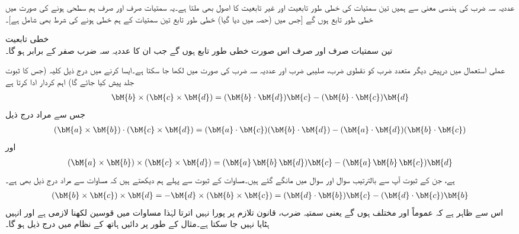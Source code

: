 عددیہ سہ ضرب کی ہندسی معنی سے ہمیں تین سمتیات کی خطی طور تابعیت اور غیر تابعیت کا اصول بھی ملتا ہے۔یہ سمتیات صرف اور صرف ہم سطحی ہونے کی صورت میں خطی طور تابع ہوں گے [جس میں (حصہ  میں دیا گیا) خطی طور تابع تین سمتیات کے ہم خطی ہونے کی شرط بھی شامل ہے]۔

\quad خطی تابعیت\\
تین سمتیات صرف اور صرف اس صورت خطی طور تابع ہوں گے جب ان کا عددیہ سہ ضرب صفر کے برابر ہو گا۔

عملی استعمال میں درپیش دیگر متعدد ضرب کو نقطوی ضرب، صلیبی ضرب اور عددیہ سہ ضرب کی صورت میں لکھا جا سکتا ہے۔ایسا کرنے میں درج ذیل کلیہ (جس کا ثبوت جلد پیش کیا جائے گا) اہم کردار ادا کرتا ہے
\begin{align}\label{مساوات_الجبرا_خطیت_اور_حجم_الف}
\bM{b}\times (\bM{c}\times \bM{d})=(\bM{b}\cdot \bM{d})\bM{c}-(\bM{b}\cdot\bM{c})\bM{d}
\end{align}
جس سے مراد درج ذیل  
\begin{align}\label{مساوات_الجبرا_خطیت_اور_حجم_ب}
(\bM{a}\times \bM{b})\cdot(\bM{c}\times\bM{d})=(\bM{a}\cdot\bM{c})(\bM{b}\cdot\bM{d})-(\bM{a}\cdot\bM{d})(\bM{b}\cdot\bM{c})
\end{align}
اور
\begin{align}\label{مساوات_الجبرا_خطیت_اور_حجم_پ}
(\bM{a}\times \bM{b})\times(\bM{c}\times\bM{d})=(\bM{a}\,\bM{b}\,\bM{d})\bM{c}-(\bM{a}\,\bM{b}\,\bM{c})\bM{d}
\end{align}
ہے، جن کے ثبوت آپ سے بالترتیب سوال  اور سوال  میں مانگے گئے ہیں۔مساوات   کے ثبوت سے پہلے ہم دیکھتے ہیں کہ مساوات  سے مراد درج ذیل بھی ہے۔
\begin{align*}
(\bM{b}\times \bM{c})\times \bM{d}=-\bM{d}\times (\bM{b}\times \bM{c})=(\bM{d}\cdot \bM{b})\bM{c}-(\bM{d}\cdot\bM{c})\bM{b}
\end{align*}
اس سے ظاہر ہے کہ عموماً  اور  مختلف ہوں گے یعنی سمتیہ ضرب،  قانون تلازم پر پورا نہیں اترتا لہٰذا مساوات  میں قوسین لکھنا لازمی ہے اور انہیں ہٹایا نہیں جا سکتا ہے۔مثال کے طور پر دائیں ہاتھ کے نظام میں درج ذیل ہو گا۔
